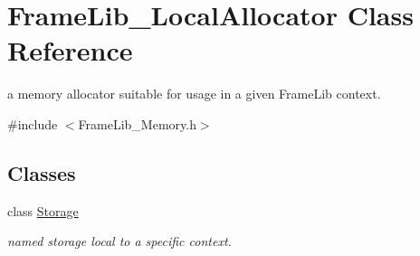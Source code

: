 \hypertarget{class_frame_lib___local_allocator}{}\section{Frame\+Lib\+\_\+\+Local\+Allocator Class Reference}
\label{class_frame_lib___local_allocator}


a memory allocator suitable for usage in a given Frame\+Lib context.  




{\ttfamily \#include $<$Frame\+Lib\+\_\+\+Memory.\+h$>$}

\subsection*{Classes}
\begin{DoxyCompactItemize}
\item 
class \hyperlink{class_frame_lib___local_allocator_1_1_storage}{Storage}
\begin{DoxyCompactList}\small\item\em named storage local to a specific context. \end{DoxyCompactList}\end{DoxyCompactItemize}
